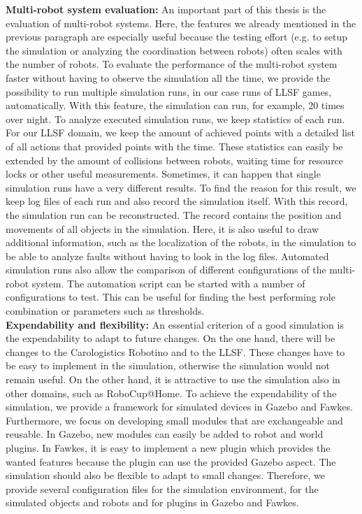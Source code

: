 \textbf{Multi-robot system evaluation:} An important part of this thesis is the evaluation of multi-robot systems. Here, the features we already mentioned in the previous paragraph are especially useful because the testing effort (e.g. to setup the simulation or analyzing the coordination between robots) often scales with the number of robots. To evaluate the performance of the multi-robot system faster without having to observe the simulation all the time, we provide the possibility to run multiple simulation runs, in our case runs of LLSF games, automatically. With this feature, the simulation can run, for example, 20 times over night. To analyze executed simulation runs, we keep statistics of each run. For our LLSF domain, we keep the amount of achieved points with a detailed list of all actions that provided points with the time. These statistics can easily be extended by the amount of collisions between robots, waiting time for resource locks or other useful measurements. Sometimes, it can happen that single simulation runs have a very different results. To find the reason for this result, we keep log files of each run and also record the simulation itself. With this record, the simulation run can be reconstructed. The record contains the position and movements of all objects in the simulation. Here, it is also useful to draw additional information, such as the localization of the robots, in the simulation to be able to analyze faults without having to look in the log files. Automated simulation runs also allow the comparison of different configurations of the multi-robot system. The automation script can be started with a number of configurations to test. This can be useful for finding the best performing role combination or parameters such as thresholds.\\
\textbf{Expendability and flexibility:} An essential criterion of a good simulation is the expendability to adapt to future changes. On the one hand, there will be changes to the Carologistics Robotino and to the LLSF. These changes have to be easy to implement in the simulation, otherwise the simulation would not remain useful. On the other hand, it is attractive to use the simulation also in other domains, such as RoboCup@Home. To achieve the expendability of the simulation, we provide a framework for simulated devices in Gazebo and Fawkes. Furthermore, we focus on developing small modules that are exchangeable and reusable. In Gazebo, new modules can easily be added to robot and world plugins. In Fawkes, it is easy to implement a new plugin which provides the wanted features because the plugin can use the provided Gazebo aspect. The simulation should also be flexible to adapt to small changes. Therefore, we provide several configuration files for the simulation environment, for the simulated objects and robots and for plugins in Gazebo and Fawkes.\\
